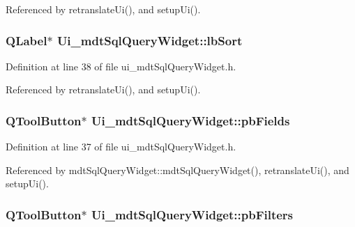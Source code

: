 Referenced by retranslate\-Ui(), and setup\-Ui().

\hypertarget{class_ui__mdt_sql_query_widget_a8fc965ad1ddbaf0e8d9395cb99ffc3f6}{
\subsubsection[{lb\-Sort}]{\setlength{\rightskip}{0pt plus 5cm}Q\-Label$\ast$ Ui\-\_\-mdt\-Sql\-Query\-Widget\-::lb\-Sort}}\label{class_ui__mdt_sql_query_widget_a8fc965ad1ddbaf0e8d9395cb99ffc3f6}


Definition at line 38 of file ui\-\_\-mdt\-Sql\-Query\-Widget.\-h.



Referenced by retranslate\-Ui(), and setup\-Ui().

\hypertarget{class_ui__mdt_sql_query_widget_a218433a4d53dc34a34462c16b435cab4}{
\subsubsection[{pb\-Fields}]{\setlength{\rightskip}{0pt plus 5cm}Q\-Tool\-Button$\ast$ Ui\-\_\-mdt\-Sql\-Query\-Widget\-::pb\-Fields}}\label{class_ui__mdt_sql_query_widget_a218433a4d53dc34a34462c16b435cab4}


Definition at line 37 of file ui\-\_\-mdt\-Sql\-Query\-Widget.\-h.



Referenced by mdt\-Sql\-Query\-Widget\-::mdt\-Sql\-Query\-Widget(), retranslate\-Ui(), and setup\-Ui().

\hypertarget{class_ui__mdt_sql_query_widget_a87b20818afed1b534eb6d872044a953b}{
\subsubsection[{pb\-Filters}]{\setlength{\rightskip}{0pt plus 5cm}Q\-Tool\-Button$\ast$ Ui\-\_\-mdt\-Sql\-Query\-Widget\-::pb\-Filters}}\label{class_ui__mdt_sql_query_widget_a87b20818afed1b534eb6d872044a953b}


